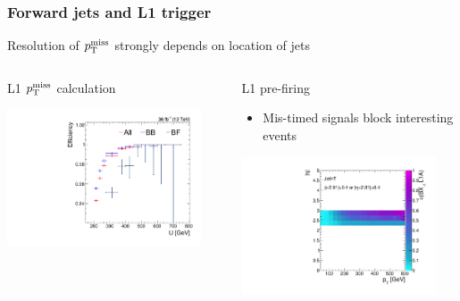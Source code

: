 \documentclass[aspectratio=169,xcolor=dvipsnames,,table,compress]{beamer}
\begin{document}
\begin{frame} \frametitle{Forward jets and L1 trigger}
  \vspace{-3mm}
  \centering 
  Resolution of $p_\text{T}^\text{miss}$ strongly depends on location of jets \\ 
  \vspace{1mm}
  \begin{columns}[T]
    \begin{column}{0.33\textwidth}
      \centering 
        L1 $p_\text{T}^\text{miss}$ calculation 
      \begin{itemize} 
      \end{itemize}
      \includegraphics[width=0.9\textwidth]{../figures/vbf/triggers/trigeff_nmu1pfUWmag.pdf}
    \end{column}
    \begin{column}{0.33\textwidth}
      \centering 
      L1 pre-firing 
      \begin{itemize}
        \item {\small Mis-timed signals block interesting events}
      \end{itemize}
      \includegraphics[width=0.9\textwidth]{../figures/vbf/triggers/JetHT_spike_finor_pteta_ratio.pdf}

\end{column}
\end{columns}
\end{frame}
\end{document}
